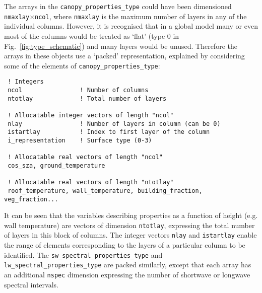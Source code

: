 \documentclass[a4,oneside]{article}
\def\codesize{\small}
\def\code#1{{\codesize\texttt{#1}}}
\begin{document}
The arrays in the \code{canopy\_properties\_type} could have been
dimensioned \code{nmaxlay}$\times$\code{ncol}, where \code{nmaxlay} is
the maximum number of layers in any of the individual columns.
However, it is recognised that in a global model many or even most of
the columns would be treated as `flat' (type 0 in
Fig.\ \ref{fig:type_schematic}) and many layers would be unused.
Therefore the arrays in these objects use a `packed' representation,
explained by considering some of the elements of
\code{canopy\_properties\_type}:
\begin{lstlisting}
 ! Integers
 ncol                ! Number of columns
 ntotlay             ! Total number of layers

 ! Allocatable integer vectors of length "ncol"
 nlay                ! Number of layers in column (can be 0)
 istartlay           ! Index to first layer of the column
 i_representation    ! Surface type (0-3)

 ! Allocatable real vectors of length "ncol"
 cos_sza, ground_temperature

 ! Allocatable real vectors of length "ntotlay"
 roof_temperature, wall_temperature, building_fraction, veg_fraction...
\end{lstlisting}
It can be seen that the variables describing properties as a function
of height (e.g. wall temperature) are vectors of dimension
\code{ntotlay}, expressing the total number of layers in this block of
columns. The integer vectors \code{nlay} and \code{istartlay} enable
the range of elements corresponding to the layers of a particular
column to be identified.  The \code{sw\_spectral\_properties\_type}
and \code{lw\_spectral\_properties\_type} are packed similarly, except
that each array has an additional \code{nspec} dimension expressing
the number of shortwave or longwave spectral intervals.
\end{document}
